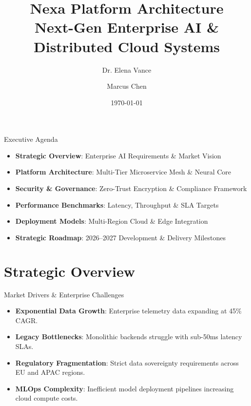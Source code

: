 \documentclass[style=fyma,palette=blue]{powerdot}
\title{\Huge Nexa Platform Architecture\\ \Large Next-Gen Enterprise AI \& Distributed Cloud Systems}
\author{Dr. Elena Vance \and Marcus Chen}
\date{\today}
\begin{document}
\maketitle

\begin{slide}{Executive Agenda}
\begin{itemize}
  \item \textbf{Strategic Overview}: Enterprise AI Requirements \& Market Vision
  \item \textbf{Platform Architecture}: Multi-Tier Microservice Mesh \& Neural Core
  \item \textbf{Security \& Governance}: Zero-Trust Encryption \& Compliance Framework
  \item \textbf{Performance Benchmarks}: Latency, Throughput \& SLA Targets
  \item \textbf{Deployment Models}: Multi-Region Cloud \& Edge Integration
  \item \textbf{Strategic Roadmap}: 2026--2027 Development \& Delivery Milestones
\end{itemize}
\end{slide}

\section{Strategic Overview}

\begin{slide}{Market Drivers \& Enterprise Challenges}
\begin{itemize}
  \item \textbf{Exponential Data Growth}: Enterprise telemetry data expanding at 45\% CAGR.
  \item \textbf{Legacy Bottlenecks}: Monolithic backends struggle with sub-50ms latency SLAs.
  \item \textbf{Regulatory Fragmentation}: Strict data sovereignty requirements across EU and APAC regions.
  \item \textbf{MLOps Complexity}: Inefficient model deployment pipelines increasing cloud compute costs.
\end{itemize}
\end{slide}
\end{document}
